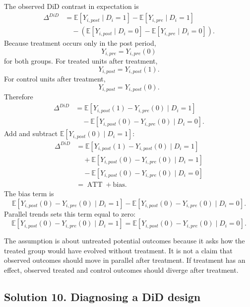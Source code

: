 \documentclass[11pt]{article}
\newcommand{\E}{\mathbb{E}}
\newcommand{\ATT}{\operatorname{ATT}}
\begin{document}
\begin{solutionbox}
The observed DiD contrast in expectation is
\begin{align*}
\Delta^{DiD}
&=
\E[Y_{i,post}\mid D_i=1]-\E[Y_{i,pre}\mid D_i=1]\\
&\quad-\left(\E[Y_{i,post}\mid D_i=0]-\E[Y_{i,pre}\mid D_i=0]\right).
\end{align*}
Because treatment occurs only in the post period,
\[
Y_{i,pre}=Y_{i,pre}(0)
\]
for both groups. For treated units after treatment,
\[
Y_{i,post}=Y_{i,post}(1).
\]
For control units after treatment,
\[
Y_{i,post}=Y_{i,post}(0).
\]
Therefore
\begin{align*}
\Delta^{DiD}
&=
\E[Y_{i,post}(1)-Y_{i,pre}(0)\mid D_i=1]\\
&\quad-\E[Y_{i,post}(0)-Y_{i,pre}(0)\mid D_i=0].
\end{align*}
Add and subtract $\E[Y_{i,post}(0)\mid D_i=1]$:
\begin{align*}
\Delta^{DiD}
&=
\E[Y_{i,post}(1)-Y_{i,post}(0)\mid D_i=1]\\
&\quad+
\E[Y_{i,post}(0)-Y_{i,pre}(0)\mid D_i=1]\\
&\quad-
\E[Y_{i,post}(0)-Y_{i,pre}(0)\mid D_i=0]\\
&=
\ATT+\text{bias}.
\end{align*}
The bias term is
\[
\E[Y_{i,post}(0)-Y_{i,pre}(0)\mid D_i=1]
-
\E[Y_{i,post}(0)-Y_{i,pre}(0)\mid D_i=0].
\]
Parallel trends sets this term equal to zero:
\[
\E[Y_{i,post}(0)-Y_{i,pre}(0)\mid D_i=1]
=
\E[Y_{i,post}(0)-Y_{i,pre}(0)\mid D_i=0].
\]

The assumption is about untreated potential outcomes because it asks how the treated group would have evolved without treatment. It is not a claim that observed outcomes should move in parallel after treatment. If treatment has an effect, observed treated and control outcomes should diverge after treatment.
\end{solutionbox}

\subsection*{Solution 10. Diagnosing a DiD design}
\end{document}
